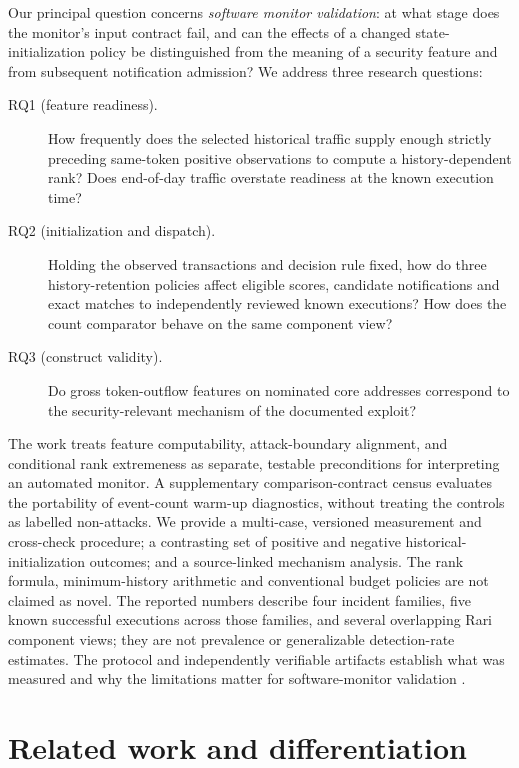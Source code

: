 \documentclass[preprint,12pt,authoryear]{elsarticle}
\begin{document}
Our principal question concerns \emph{software monitor validation}: at what stage does the monitor's input contract fail, and can the effects of a changed state-initialization policy be distinguished from the meaning of a security feature and from subsequent notification admission? We address three research questions:

\begin{description}
\item[RQ1 (feature readiness).] How frequently does the selected historical traffic supply enough strictly preceding same-token positive observations to compute a history-dependent rank? Does end-of-day traffic overstate readiness at the known execution time?
\item[RQ2 (initialization and dispatch).] Holding the observed transactions and decision rule fixed, how do three history-retention policies affect eligible scores, candidate notifications and exact matches to independently reviewed known executions? How does the count comparator behave on the same component view?
\item[RQ3 (construct validity).] Do gross token-outflow features on nominated core addresses correspond to the security-relevant mechanism of the documented exploit?
\end{description}

The work treats feature computability, attack-boundary alignment, and conditional rank extremeness as separate, testable preconditions for interpreting an automated monitor. A supplementary comparison-contract census evaluates the portability of event-count warm-up diagnostics, without treating the controls as labelled non-attacks. We provide a multi-case, versioned measurement and cross-check procedure; a contrasting set of positive and negative historical-initialization outcomes; and a source-linked mechanism analysis. The rank formula, minimum-history arithmetic and conventional budget policies are not claimed as novel. The reported numbers describe four incident families, five known successful executions across those families, and several overlapping Rari component views; they are not prevalence or generalizable detection-rate estimates. The protocol and independently verifiable artifacts establish what was measured and why the limitations matter for software-monitor validation \citep{Kitchenham2004Evidence,Wohlin2012Experimentation}.

\section{Related work and differentiation}\label{sec:related}
\end{document}
